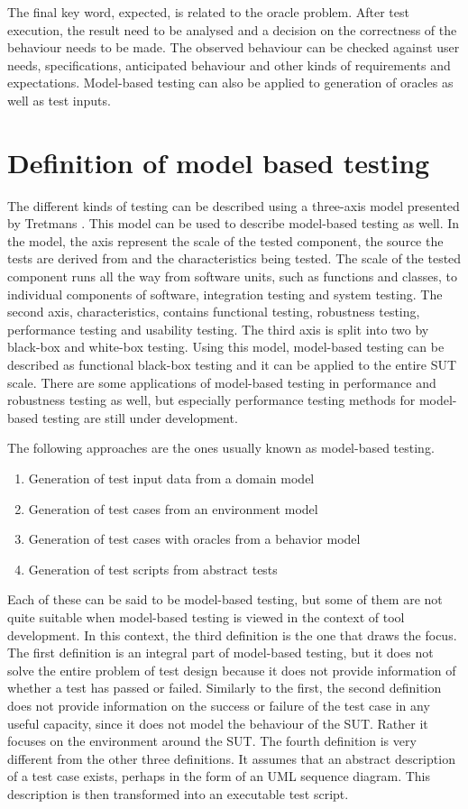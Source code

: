 The final key word, expected, is related to the oracle problem. After test execution, the result need to be analysed and a decision on the correctness of the behaviour needs to be made. The observed behaviour can be checked against user needs, specifications, anticipated behaviour and other kinds of requirements and expectations. Model-based testing can also be applied to generation of oracles as well as test inputs.

\section{Definition of model based testing}
The different kinds of testing can be described using a three-axis model presented by Tretmans \cite{tretmans}.  This model can be used to describe model-based testing as well. In the model, the axis represent the scale of the tested component, the source the tests are derived from and the characteristics being tested. The scale of the tested component runs all the way from software units, such as functions and classes, to individual components of software, integration testing and system testing. The second axis, characteristics, contains functional testing, robustness testing, performance testing and usability testing. The third axis is split into two by black-box and white-box testing. Using this model, model-based testing can be described as functional black-box testing and it can be applied to the entire SUT scale. There are some applications of model-based testing in performance and robustness testing as well, but especially performance testing methods for model-based testing are still under development.


The following approaches are the ones usually known as model-based testing.
 
\begin{enumerate}
	\item Generation of test input data from a domain model
	\item Generation of test cases from an environment model
	\item Generation of test cases with oracles from a behavior model
	\item Generation of test scripts from abstract tests
\end{enumerate}

Each of these can be said to be model-based testing, but some of them are not quite suitable when model-based testing is viewed in the context of tool development. In this context, the third definition is the one that draws the focus.
The first definition is an integral part of model-based testing, but it does not solve the entire problem of test design because it does not provide information of whether a test has passed or failed. Similarly to the first, the second definition does not provide information on the success or failure of the test case in any useful capacity, since it does not model the behaviour of the SUT. Rather it focuses on the environment around the SUT. The fourth definition is very different from the other three definitions. It assumes that an abstract description of a test case exists, perhaps in the form of an UML sequence diagram. This description is then transformed into an executable test script.

